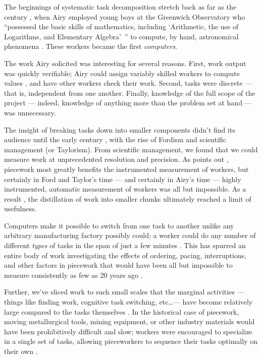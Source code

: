 \documentclass[trackingWork]{subfiles}
\begin{document}
\subsubsubsection{\pieceworkpers}
The beginnings of
systematic task decomposition
stretch back as far as the  century%
, when Airy employed young boys at the Greenwich Observatory who
``possessed the basic skills of mathematics, including
`Arithmetic, the use of Logarithms, and Elementary Algebra'~''
to compute, by hand, astronomical phenomena
\cite{grier2013computers}.
These workers became the first \textit{computers}.

The work Airy solicited was interesting for several reasons.
First, work output was quickly verifiable;
Airy could assign variably skilled workers to compute values%
, and have other workers check their work.
Second, tasks were discrete --- that is, independent from one another.
Finally, knowledge of the full scope of the project
--- indeed, knowledge of anything more than the problem set at hand ---
was unnecessary.

The insight of breaking tasks down into smaller components didn't find its audience until
the early  century%
, with the rise of Fordism and scientific management (or Taylorism).
From scientific management, we found that
we could measure work at unprecedented resolution and precision.
As \citeauthor{Brown01041990} points out%
, piecework most greatly benefits the instrumented measurement of workers, but certainly
in Ford and Taylor's time --- and certainly in Airy's time ---
highly instrumented, automatic measurement of workers was all but impossible.
As a result%
, the distillation of work into smaller chunks
ultimately reached a limit of usefulness.


\subsubsubsection{\whatchanged}
 Computers make it possible to switch from one task to another
unlike any arbitrary manufacturing factory possibly could;
a worker could do any number of
different \textit{types} of tasks in the span of just a few minutes
\cite{delayAndOrderLasecki}.
This has spurred an entire body of work investigating the effects of
ordering,
pacing,
interruptions, and
other factors in piecework that would have been
all but impossible to measure consistently as few as 20 years ago
\cite{cheng2015break,measuringCrowdsourcingCheng,embracingErrorKrishna}.
 
Further, we've sliced work to such small scales that the marginal activities
--- things like finding work, cognitive task switching, etc\dots ---
have become relatively large compared to the tasks themselves
\cite{taskSearch}.
In the historical case of piecework,
moving metallurgical tools, mining equipment, or
other industry materials would have been prohibitively difficult and slow;
workers were encouraged to specialize in a single set of tasks,
allowing pieceworkers to sequence their tasks optimally on their own
\cite{hart2013rise}.
\end{document}
